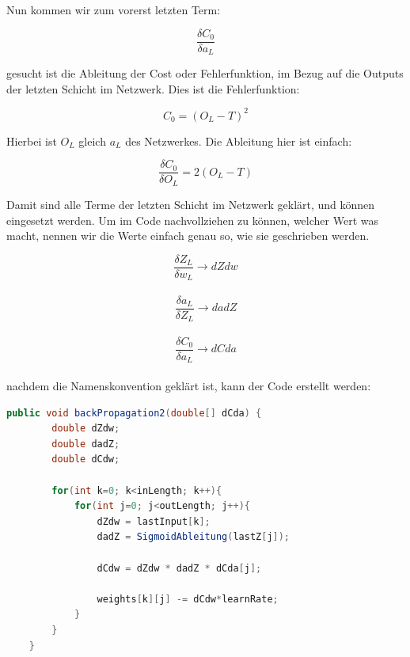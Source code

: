 \documentclass[12pt]{article}
\begin{document}
Nun kommen wir zum vorerst letzten Term:

$$\frac{\delta C_0}{\delta a_L}$$

gesucht ist die Ableitung der Cost oder Fehlerfunktion, im Bezug auf die Outputs der letzten Schicht im Netzwerk. Dies ist die Fehlerfunktion:

$$C_0 = (O_L - T)^2$$

Hierbei ist $O_L$ gleich $a_L$ des Netzwerkes.
Die Ableitung hier ist einfach:

$$\frac{\delta C_0}{\delta O_L} = 2(O_L - T)$$

Damit sind alle Terme der letzten Schicht im Netzwerk geklärt, und können eingesetzt werden.
Um im Code nachvollziehen zu können, welcher Wert was macht, nennen wir die Werte einfach genau so, wie sie geschrieben werden.


$$\frac{\delta Z_L}{\delta w_L} \rightarrow dZdw $$ \\
$$\frac{\delta a_L}{\delta Z_L} \rightarrow dadZ $$ \\
$$\frac{\delta C_0}{\delta a_L} \rightarrow dCda $$ \\

nachdem die Namenskonvention geklärt ist, kann der Code erstellt werden:

\begin{lstlisting}[language=Java] 
    public void backPropagation2(double[] dCda) {
        double dZdw;
        double dadZ;
        double dCdw;

        for(int k=0; k<inLength; k++){
            for(int j=0; j<outLength; j++){
                dZdw = lastInput[k];
                dadZ = SigmoidAbleitung(lastZ[j]);

                dCdw = dZdw * dadZ * dCda[j];

                weights[k][j] -= dCdw*learnRate;
            }
        }
    }
\end{lstlisting} 
\end{document}
